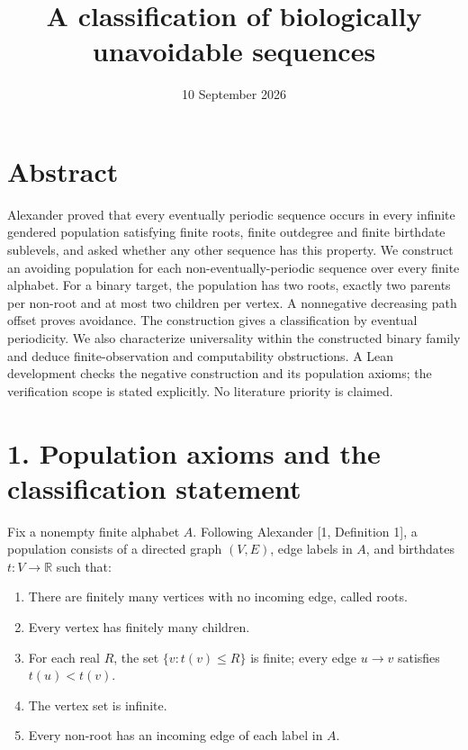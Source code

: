 \documentclass[
  11pt,
]{article}
\title{A classification of biologically unavoidable sequences}
\author{}
\date{10 September 2026}
\providecommand{\tightlist}{%
  \setlength{\itemsep}{0pt}\setlength{\parskip}{0pt}}
\begin{document}
\maketitle

\section{Abstract}\label{abstract}

Alexander proved that every eventually periodic sequence occurs in every
infinite gendered population satisfying finite roots, finite outdegree
and finite birthdate sublevels, and asked whether any other sequence has
this property. We construct an avoiding population for each
non-eventually-periodic sequence over every finite alphabet. For a
binary target, the population has two roots, exactly two parents per
non-root and at most two children per vertex. A nonnegative decreasing
path offset proves avoidance. The construction gives a classification by
eventual periodicity. We also characterize universality within the
constructed binary family and deduce finite-observation and
computability obstructions. A Lean development checks the negative
construction and its population axioms; the verification scope is stated
explicitly. No literature priority is claimed.

\section{1. Population axioms and the classification
statement}\label{population-axioms-and-the-classification-statement}

Fix a nonempty finite alphabet \(A\). Following Alexander {[}1,
Definition 1{]}, a population consists of a directed graph \((V,E)\),
edge labels in \(A\), and birthdates \(t:V\to\mathbb R\) such that:

\begin{enumerate}
\def\labelenumi{\arabic{enumi}.}
\tightlist
\item
  There are finitely many vertices with no incoming edge, called roots.
\item
  Every vertex has finitely many children.
\item
  For each real \(R\), the set \(\{v:t(v)\le R\}\) is finite; every edge
  \(u\to v\) satisfies \(t(u)<t(v)\).
\item
  The vertex set is infinite.
\item
  Every non-root has an incoming edge of each label in \(A\).
\end{enumerate}
\end{document}
